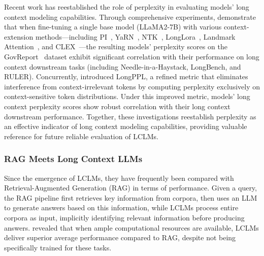 \documentclass[11pt, a4paper, logo, copyright, nonumbering]{map}
\begin{document}
Recent work has reestablished the role of perplexity in evaluating models' long context modeling capabilities. Through comprehensive experiments, \citet{lu2024controlled} demonstrate that when fine-tuning a single base model (LLaMA2-7B) with various context-extension methods—including PI~\citep{chen2023extending}, YaRN~\citep{peng2023yarn}, NTK~\citep{ntk}, LongLora~\citep{chen2023longlora}, Landmark Attention~\citep{mohtashami2023landmark}, and CLEX~\citep{chen2024clex}—the resulting models' perplexity scores on the GovReport~\citep{huang2021efficient} dataset exhibit significant correlation with their performance on long context downstream tasks (including Needle-in-a-Haystack, LongBench, and RULER). 
Concurrently, \citet{fang2024wrong} introduced LongPPL, a refined metric that eliminates interference from context-irrelevant tokens by computing perplexity exclusively on context-sensitive token distributions. 
Under this improved metric, models' long context perplexity scores show robust correlation with their long context downstream performance. 
Together, these investigations reestablish perplexity as an effective indicator of long context modeling capabilities, providing valuable reference for future reliable evaluation of LCLMs.






\subsubsection{RAG Meets Long Context LLMs}




Since the emergence of LCLMs, they have frequently been compared with Retrieval-Augmented Generation (RAG) in terms of performance. Given a query, the RAG pipeline first retrieves key information from corpora, then uses an LLM to generate answers based on this information, while LCLMs process entire corpora as input, implicitly identifying relevant information before producing answers. \citet{li2024retrieval,lee2024can} revealed that when ample computational resources are available, LCLMs deliver superior average performance compared to RAG, despite not being specifically trained for these tasks.
\end{document}
